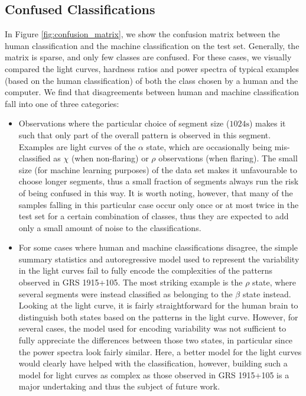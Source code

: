 \documentclass[fleqn,usenatbib]{mnras}
\begin{document}
\subsection{Confused Classifications}
\label{sec:confusion}

In Figure \ref{fig:confusion_matrix}, we show the confusion matrix between the human classification and the machine classification on the 
test set. Generally, the matrix is sparse, and only few classes are confused. For these cases, we visually compared the light curves, hardness ratios and power spectra of 
typical examples (based on the human classification) of both the class chosen by a human and the computer. We find that disagreements between 
human and machine classification fall into one of three categories:
\begin{itemize}
\item{Observations where the particular choice of segment size ($1024\mathrm{s}$) makes it such that only part of the overall pattern is observed in this 
segment. Examples are light curves of the $\alpha$ state, which are occasionally being mis-classified as $\chi$ (when non-flaring) or $\rho$ observations (when flaring). 
The small size (for machine learning purposes) of the data set makes it unfavourable to choose longer segments, thus a small fraction of segments always run the risk of being 
confused in this way. It is worth noting, however, that many of the samples falling in this particular case occur only once or at most twice in the 
test set for a certain combination of classes, thus they are expected to add only a small amount of noise to the classifications.}
\item{For some cases where human and machine classifications disagree, the simple summary statistics and autoregressive model used to represent the variability
 in the light curves fail to fully encode the complexities of the patterns observed in GRS 1915+105. The most striking example is the $\rho$ state, where several 
 segments were instead classified as belonging to the $\beta$ state instead. Looking at the light curve, it is fairly straightforward for the human brain to distinguish 
 both states based on the patterns in the light curve. However, for several cases, the model used for encoding variability was not sufficient to fully appreciate the differences between those two states, in particular since the power spectra look fairly similar. Here, a better model for the light curves would clearly have helped with the classification, however, building such a model for light curves as complex as those observed in GRS 1915+105 is a major undertaking and thus the subject of future work.}

\end{itemize}
\end{document}
